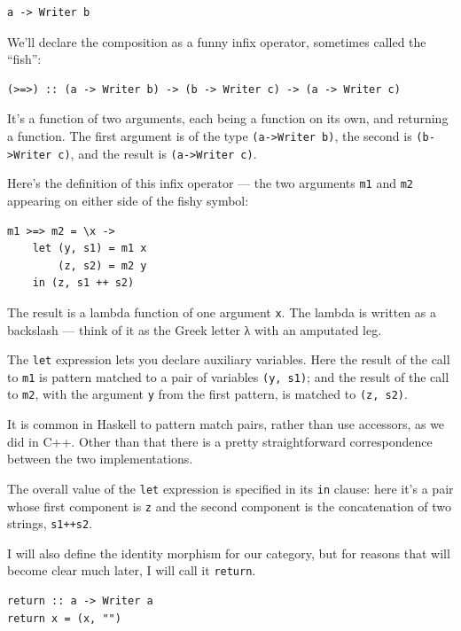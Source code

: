 \begin{verbatim}
a -> Writer b
\end{verbatim}

We'll declare the composition as a funny infix operator, sometimes
called the ``fish'':

\begin{verbatim}
(>=>) :: (a -> Writer b) -> (b -> Writer c) -> (a -> Writer c)
\end{verbatim}

It's a function of two arguments, each being a function on its own, and
returning a function. The first argument is of the type
\texttt{(a->Writer b)}, the second is
\texttt{(b->Writer c)}, and the result is
\texttt{(a->Writer c)}.

Here's the definition of this infix operator --- the two arguments
\texttt{m1} and \texttt{m2} appearing on either side of the fishy
symbol:

\begin{verbatim}
m1 >=> m2 = \x ->
    let (y, s1) = m1 x
        (z, s2) = m2 y
    in (z, s1 ++ s2)
\end{verbatim}

The result is a lambda function of one argument \texttt{x}. The lambda
is written as a backslash --- think of it as the Greek letter λ with an
amputated leg.

The \texttt{let} expression lets you declare auxiliary variables. Here
the result of the call to \texttt{m1} is pattern matched to a pair of
variables \texttt{(y, s1)}; and the result of the call to \texttt{m2},
with the argument \texttt{y} from the first pattern, is matched to
\texttt{(z, s2)}.

It is common in Haskell to pattern match pairs, rather than use
accessors, as we did in C++. Other than that there is a pretty
straightforward correspondence between the two implementations.

The overall value of the \texttt{let} expression is specified in its
\texttt{in} clause: here it's a pair whose first component is \texttt{z}
and the second component is the concatenation of two strings,
\texttt{s1++s2}.

I will also define the identity morphism for our category, but for
reasons that will become clear much later, I will call it
\texttt{return}.

\begin{verbatim}
return :: a -> Writer a
return x = (x, "")
\end{verbatim}

